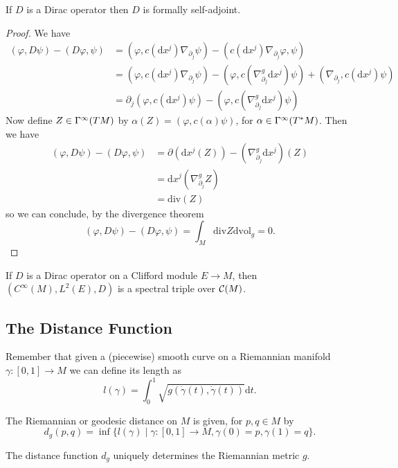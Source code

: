 \begin{proposition}
 If $D$ is a Dirac operator then $D$ is formally self-adjoint.
\end{proposition}
\begin{proof}
 We have \begin{align*}
          (\varphi,D\psi)-(D\varphi,\psi)&=(\varphi,c(\mathrm{d}x^j)\nabla_{\partial_j}\psi)-(c(\mathrm{d}x^j)\nabla_{\partial_j}\varphi,\psi) \\ &=(\varphi,c(\mathrm{d}x^j)\nabla_{\partial_j}\psi)-(\varphi,c(\nabla^g_{\partial_j}\mathrm{d}x^j)\psi)+(\nabla_{\partial_j},c(\mathrm{d}x^j)\psi)\\
          &=\partial_j(\varphi,c(\mathrm{d}x^j)\psi)-(\varphi,c(\nabla^g_{\partial_j}\mathrm{d}x^j)\psi)
         \end{align*}
Now define $Z\in\Gamma^\infty(TM)$ by $\alpha(Z)=(\varphi,c(\alpha)\psi)$, for $\alpha\in\Gamma^\infty(T^\ast M)$. Then we have 
\begin{align*}
 (\varphi,D\psi)-(D\varphi,\psi)&=\partial(\mathrm{d}x^j(Z))-(\nabla^g_{\partial_j}\mathrm{d}x^j)(Z)\\
 &=\mathrm{d}x^j(\nabla^g_{\partial_j}Z)\\
 &=\mathrm{div}(Z)
\end{align*}
so we can conclude, by the divergence theorem 
$$(\varphi,D\psi)-(D\varphi,\psi)=\int_M\mathrm{div} Z\mathrm{dvol}_g=0.$$
\end{proof}

\begin{corollary}
 If $D$ is a Dirac operator on a Clifford module $E\to M$, then $(C^\infty(M),L^2(E),D)$ is a spectral triple over $\mathcal{C}(M)$.
\end{corollary}

\subsection{The Distance Function}
Remember that given a (piecewise) smooth curve on a Riemannian manifold $\gamma\colon[0,1]\to M$ we can define its length as $$l(\gamma)=\int_0^1\sqrt{g(\dot\gamma(t),\dot\gamma(t))}\mathrm{d}t.$$

\begin{definition}
 The Riemannian or geodesic distance on $M$ is given, for $p,q\in M$ by $$d_g(p,q)=\inf\{l(\gamma)\mid\gamma\colon[0,1]\to M,\gamma(0)=p,\gamma(1)=q\}.$$
\end{definition}

\begin{theorem}The distance function $d_g$ uniquely determines the Riemannian metric $g$.
\end{theorem}

